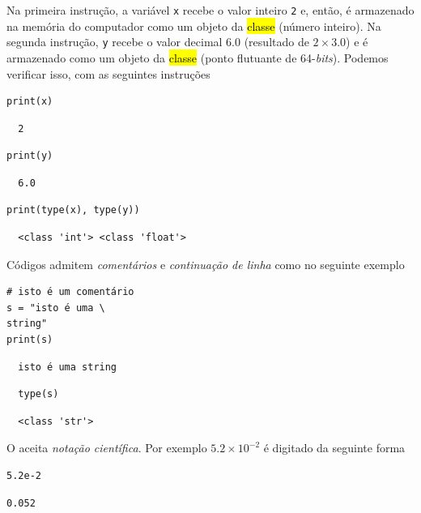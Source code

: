 \documentclass[12pt]{article}
\begin{document}
Na primeira instrução, a variável \texttt{x} recebe o valor inteiro \texttt{2} e, então, é armazenado na memória do computador como um objeto da \hl{classe {\PYTHONint}} (número inteiro). Na segunda instrução, \texttt{y} recebe o valor decimal $6.0$ (resultado de $2\times 3.0$) e é armazenado como um objeto da \hl{classe {\PYTHONfloat}} (ponto flutuante de 64-{\it bits}). Podemos verificar isso, com as seguintes instruções

\begin{lstlisting}
print(x)
\end{lstlisting}

\begin{verbatim}
  2
\end{verbatim}

\begin{lstlisting}
print(y)
\end{lstlisting}

\begin{verbatim}
  6.0
\end{verbatim}

\begin{lstlisting}
print(type(x), type(y))
\end{lstlisting}

\begin{verbatim}
  <class 'int'> <class 'float'>
\end{verbatim}

\begin{obs}
  Códigos {\python} admitem \emph{comentários} e \emph{continuação de linha} como no seguinte exemplo

\begin{lstlisting}
# isto é um comentário
s = "isto é uma \
string"
print(s)
\end{lstlisting}

\begin{verbatim}
  isto é uma string
\end{verbatim}

\begin{lstlisting}
  type(s)
\end{lstlisting}

\begin{verbatim}
  <class 'str'>
\end{verbatim}

\end{obs}

\begin{obs}
  O {\python} aceita \emph{notação científica}. Por exemplo $5.2\times 10^{-2}$ é digitado da seguinte forma

\begin{lstlisting}
5.2e-2
\end{lstlisting}

\begin{verbatim}
0.052
\end{verbatim}

\end{obs}
\end{document}

